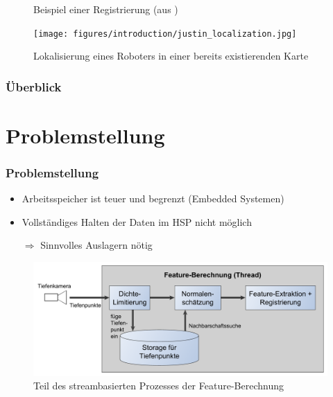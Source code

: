 \documentclass[presentation]{beamer}
\begin{document}
\begin{frame}
\begin{figure}
\begin{minipage}{.5\textwidth}
			\caption{Beispiel einer Registrierung (aus \cite{PCLReg})}
			\label{fig:RegistrierungB1}
		\end{minipage}%
		\begin{minipage}{.5\textwidth} 
			\centering
			\texttt{[image: figures/introduction/justin\_localization.jpg]}
			\caption{Lokalisierung eines Roboters in einer bereits existierenden Karte}
			\label{fig:Justin}
		\end{minipage}
		\label{fig:test}
	\end{figure} 
\end{frame} 

\begin{frame}
\frametitle{Überblick}
\tableofcontents
\end{frame}


\section{Problemstellung} 
\begin{frame}
	\frametitle{Problemstellung}
	\begin{itemize}
		\item Arbeitsspeicher ist teuer und begrenzt (Embedded Systemen)
		\item Vollständiges Halten der Daten im HSP nicht möglich
		\item [$\Rightarrow$] Sinnvolles Auslagern nötig
	\end{itemize}
	\begin{figure}
	\includegraphics[width=0.8\linewidth]{figures/relatedWorks/FeatureEstimationProcessSimplifiedBetter.pdf}
	\caption{Teil des streambasierten Prozesses der Feature-Berechnung}
	\end{figure}
\end{frame}
\end{document}
